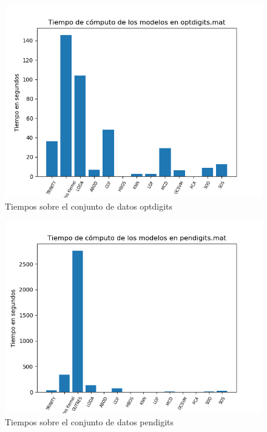 \begin{figure}[H]
	\centering
	\includegraphics[scale=0.7]{imagenes/imgs-exp1/times/optdigits}
	\caption{Tiempos sobre el conjunto de datos optdigits}
	\label{optdigits_times}
\end{figure}

\begin{figure}[H]
	\centering
	\includegraphics[scale=0.7]{imagenes/imgs-exp1/times/pendigits}
	\caption{Tiempos sobre el conjunto de datos pendigits}
	\label{pendigits_times}
\end{figure}

